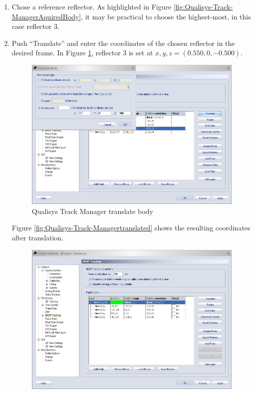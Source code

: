 \documentclass[a4paper,twoside,english]{report}
\begin{document}
\begin{enumerate}
\begin{enumerate}
\item Chose a reference reflector. As highlighted in Figure \ref{fig:Qualisys-Track-ManagerAquiredBody}, it may be practical to choose the highest-most, in this case reflector 3.
\item Push ``Translate'' and enter the coordinates of the chosen reflector in the desired frame. In Figure \ref{fig:Qualisys-Track-Managertranslate}, reflector 3 is set at $x,y,z=\left(0.550,0,-0.500\right)$. 
\begin{figure}[!h]
\centering \includegraphics[width=1\textwidth]{fig/qualisys_orientating2}
\caption{\label{fig:Qualisys-Track-Managertranslate}Qualisys Track Manager
translate body}
\end{figure}
Figure \ref{fig:Qualisys-Track-Managertranslated} shows the resulting coordinates after translation.
\begin{figure}[!h]
\centering \includegraphics[width=1\textwidth]{fig/qualisys_orientating3}

\end{figure}
\end{enumerate}
\end{enumerate}
\end{document}
